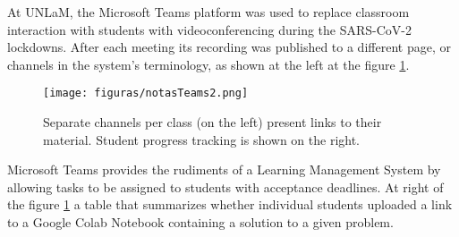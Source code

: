 
At UNLaM, the Microsoft Teams platform was used to replace classroom interaction with students with videoconferencing during the SARS-CoV-2 lockdowns.
After each meeting its recording was published to a different page, or channels in the system's terminology, as shown at the left at the figure \ref{fig:teams}.

\begin{figure}[!ht]
\centering
\texttt{[image: figuras/notasTeams2.png]}
\caption{Separate channels per class (on the left) present links to their material. Student progress tracking is shown on the right.}
\label{fig:teams}
\end{figure}

Microsoft Teams provides the rudiments of a Learning Management System by allowing tasks to be assigned to students with acceptance deadlines.
At right of the figure \ref{fig:teams} a table that summarizes whether individual students uploaded a link to a Google Colab Notebook containing a solution to a given problem.
